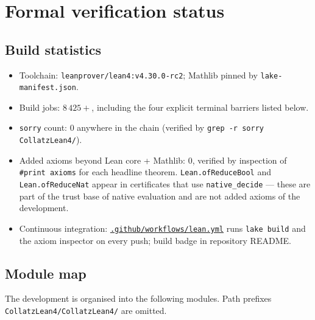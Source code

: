 \documentclass[11pt,a4paper]{article}
\theoremstyle{plain}
\theoremstyle{definition}
\begin{document}
\section{Formal verification status}\label{sec:formal-status}

\subsection{Build statistics}

\begin{itemize}
  \item Toolchain: \texttt{leanprover/lean4:v4.30.0-rc2}; Mathlib
        pinned by \texttt{lake-manifest.json}.
  \item Build jobs: \textbf{$8\,425+$}, including the four explicit
        terminal barriers listed below.
  \item \texttt{sorry} count: \textbf{$0$} anywhere in the chain
        (verified by \texttt{grep -r sorry CollatzLean4/}).
  \item Added axioms beyond Lean core + Mathlib: \textbf{$0$},
        verified by inspection of \texttt{\#print axioms} for each
        headline theorem.
        \texttt{Lean.ofReduceBool} and \texttt{Lean.ofReduceNat}
        appear in certificates that use \texttt{native\_decide} —
        these are part of the trust base of native evaluation
        and are not added axioms of the development.
  \item Continuous integration:
        \href{run:.github/workflows/lean.yml}%
             {\texttt{.github/workflows/lean.yml}}
        runs \texttt{lake build} and the axiom inspector on every
        push; build badge in repository README.
\end{itemize}

\subsection{Module map}

The development is organised into the following modules. Path
prefixes \texttt{CollatzLean4/CollatzLean4/} are omitted.
\end{document}
